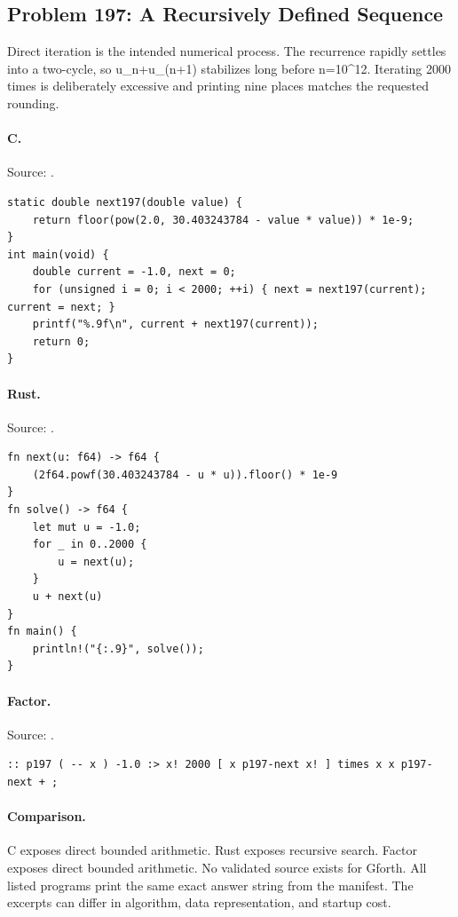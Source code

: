 \subsection{Problem 197: A Recursively Defined Sequence}
\label{walkthrough:p197}
Direct iteration is the intended numerical process. The recurrence rapidly settles into a two-cycle, so u\_n+u\_(n+1) stabilizes long before n=10\textasciicircum{}12. Iterating 2000 times is deliberately excessive and printing nine places matches the requested rounding.

\paragraph{C.} Source: .
\begin{lstlisting}
static double next197(double value) {
    return floor(pow(2.0, 30.403243784 - value * value)) * 1e-9;
}
int main(void) {
    double current = -1.0, next = 0;
    for (unsigned i = 0; i < 2000; ++i) { next = next197(current); current = next; }
    printf("%.9f\n", current + next197(current));
    return 0;
}
\end{lstlisting}

\paragraph{Rust.} Source: .
\begin{lstlisting}
fn next(u: f64) -> f64 {
    (2f64.powf(30.403243784 - u * u)).floor() * 1e-9
}
fn solve() -> f64 {
    let mut u = -1.0;
    for _ in 0..2000 {
        u = next(u);
    }
    u + next(u)
}
fn main() {
    println!("{:.9}", solve());
}
\end{lstlisting}

\paragraph{Factor.} Source: .
\begin{lstlisting}
:: p197 ( -- x ) -1.0 :> x! 2000 [ x p197-next x! ] times x x p197-next + ;
\end{lstlisting}

\paragraph{Comparison.}
C exposes direct bounded arithmetic. Rust exposes recursive search. Factor exposes direct bounded arithmetic.
No validated source exists for Gforth.
All listed programs print the same exact answer string from the manifest. The excerpts can differ in algorithm, data representation, and startup cost.

